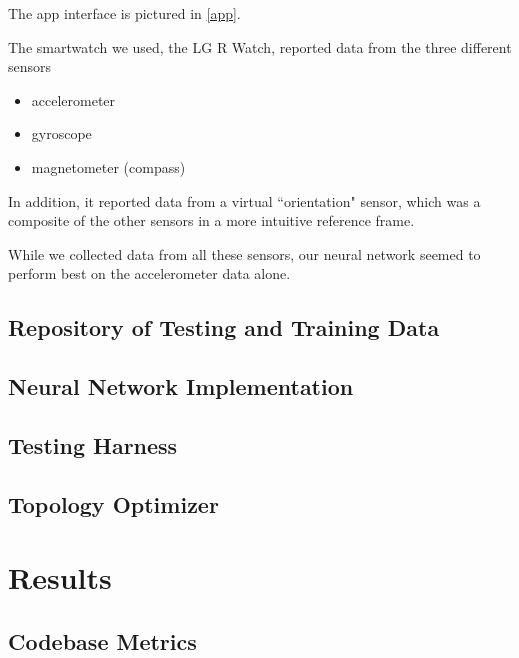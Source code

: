\documentclass{report}
\begin{document}
The app interface is pictured in \ref{app}. %

The smartwatch we used, the LG R Watch, reported data from the three different sensors
\begin{itemize}
\item accelerometer
\item gyroscope
\item magnetometer (compass)
\end{itemize}
In addition, it reported data from a virtual ``orientation" sensor, which was a composite of the other sensors in a more intuitive reference frame.

While we collected data from all these sensors, our neural network seemed to perform best on the accelerometer data alone.

\section{Repository of Testing and Training Data}

\section{Neural Network Implementation}


\section{Testing Harness}

\section{Topology Optimizer}


\chapter{Results}

\section{Codebase Metrics}

\end{document}
